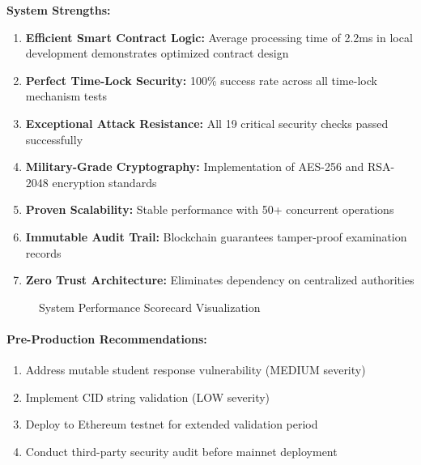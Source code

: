 \documentclass[12pt,a4paper]{article}
\begin{document}
\textbf{System Strengths:}
\begin{enumerate}
    \item \textbf{Efficient Smart Contract Logic:} Average processing time of 2.2ms in local development demonstrates optimized contract design
    \item \textbf{Perfect Time-Lock Security:} 100\% success rate across all time-lock mechanism tests
    \item \textbf{Exceptional Attack Resistance:} All 19 critical security checks passed successfully
    \item \textbf{Military-Grade Cryptography:} Implementation of AES-256 and RSA-2048 encryption standards
    \item \textbf{Proven Scalability:} Stable performance with 50+ concurrent operations
    \item \textbf{Immutable Audit Trail:} Blockchain guarantees tamper-proof examination records
    \item \textbf{Zero Trust Architecture:} Eliminates dependency on centralized authorities
\end{enumerate}

\begin{figure}[H]
    \centering
    \caption{System Performance Scorecard Visualization}
    \label{fig:scorecard}
\end{figure}

\paragraph{Pre-Production Recommendations:}
\begin{enumerate}
    \item Address mutable student response vulnerability (MEDIUM severity)
    \item Implement CID string validation (LOW severity)
    \item Deploy to Ethereum testnet for extended validation period
    \item Conduct third-party security audit before mainnet deployment
\end{enumerate}
\end{document}
